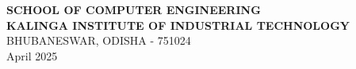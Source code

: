 \documentclass[a4paper, 12pt]{report}
\begin{document}
	
	
	
	\newpage
	\begin{center}
		\Large \textbf{SCHOOL OF COMPUTER ENGINEERING} \\[0.5cm]
		\Large \textbf{KALINGA INSTITUTE OF INDUSTRIAL TECHNOLOGY} \\[0.5cm]
		\large BHUBANESWAR, ODISHA - 751024 \\[1cm]
		\large April 2025
	\end{center}
	
	
	

	
	
	
	\tableofcontents
	
	
	
	
	
	
\end{document}
